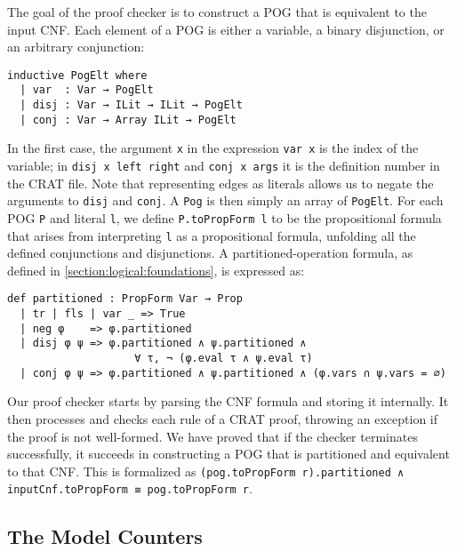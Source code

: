 The goal of the proof checker is to construct a POG that is equivalent to the input CNF.
Each element of a POG  is either a variable, a binary disjunction,
or an arbitrary conjunction:
\begin{lstlisting}
inductive PogElt where
  | var  : Var → PogElt
  | disj : Var → ILit → ILit → PogElt
  | conj : Var → Array ILit → PogElt
\end{lstlisting}
In the first case, the argument \lstinline{x} in the expression
\lstinline{var x} is the index
of the variable; in \lstinline{disj x left right} and \lstinline{conj x args}
it is the definition number in the CRAT file. Note that representing edges as literals allows us to negate the arguments to \lstinline{disj} and \lstinline{conj}.
A \lstinline{Pog} is then simply an array of \lstinline{PogElt}.
For each POG \lstinline{P} and literal \lstinline{l}, we define
\lstinline{P.toPropForm l} to be the
propositional formula that arises from interpreting \lstinline{l} as a propositional
formula, unfolding all the defined conjunctions and disjunctions.
A partitioned-operation formula, as defined in \cref{section:logical:foundations}, is expressed as:
\begin{lstlisting}
def partitioned : PropForm Var → Prop
  | tr | fls | var _ => True
  | neg φ    => φ.partitioned
  | disj φ ψ => φ.partitioned ∧ ψ.partitioned ∧
                    ∀ τ, ¬ (φ.eval τ ∧ ψ.eval τ)
  | conj φ ψ => φ.partitioned ∧ ψ.partitioned ∧ (φ.vars ∩ ψ.vars = ∅)
\end{lstlisting}

Our proof checker starts by parsing the CNF formula and storing it internally.
It then processes and checks each rule of a CRAT proof, throwing an exception if
the proof is not well-formed. We have proved that if the checker terminates successfully,
it succeeds in constructing a POG that is partitioned and equivalent to that CNF. This is formalized as \lstinline{(pog.toPropForm r).partitioned ∧ inputCnf.toPropForm ≡ pog.toPropForm r}.

\subsection{The Model Counters}
\label{subsection:counting}

